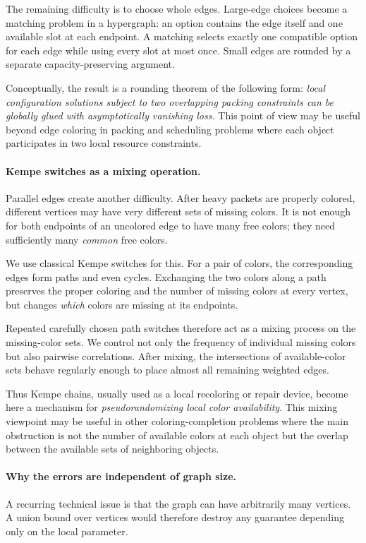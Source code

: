 \documentclass[11pt]{article}
\theoremstyle{definition}\newtheorem{algorithm}{Algorithm}[section]
\numberwithin{equation}{section}
\theoremstyle{remark}\newtheorem*{remark}{Remark}
\begin{document}
The remaining difficulty is to choose whole edges.  Large-edge choices become a matching problem in a hypergraph: an option contains the edge itself and one available slot at each endpoint.  A matching selects exactly one compatible option for each edge while using every slot at most once.  Small edges are rounded by a separate capacity-preserving argument.

Conceptually, the result is a rounding theorem of the following form:
\emph{local configuration solutions subject to two overlapping packing constraints can be globally glued with asymptotically vanishing loss.}
This point of view may be useful beyond edge coloring in packing and scheduling problems where each object participates in two local resource constraints.

\paragraph{Kempe switches as a mixing operation.}
Parallel edges create another difficulty.  After heavy packets are properly colored, different vertices may have very different sets of missing colors.  It is not enough for both endpoints of an uncolored edge to have many free colors; they need sufficiently many \emph{common} free colors.

We use classical Kempe switches for this.  For a pair of colors, the corresponding edges form paths and even cycles.  Exchanging the two colors along a path preserves the proper coloring and the number of missing colors at every vertex, but changes \emph{which} colors are missing at its endpoints.

Repeated carefully chosen path switches therefore act as a mixing process on the missing-color sets.  We control not only the frequency of individual missing colors but also pairwise correlations.  After mixing, the intersections of available-color sets behave regularly enough to place almost all remaining weighted edges.

Thus Kempe chains, usually used as a local recoloring or repair device, become here a mechanism for \textit{pseudorandomizing local color availability}.
This mixing viewpoint may be useful in other coloring-completion problems where the main obstruction is not the number of available colors at each object but the overlap between the available sets of neighboring objects.

\paragraph{Why the errors are independent of graph size.}
A recurring technical issue is that the graph can have arbitrarily many vertices.  A union bound over vertices would therefore destroy any guarantee depending only on the local parameter.
\end{document}
